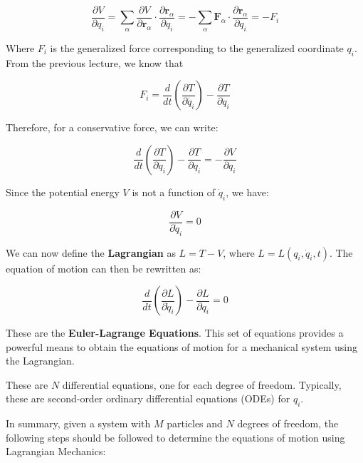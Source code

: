 \begin{equation}
    \frac{\partial V}{\partial q_i}=\sum_\alpha \frac{\partial V}{\partial \mathbf{r}_\alpha} \cdot \frac{\partial \mathbf{r}_\alpha}{\partial q_i}=-\sum_\alpha \mathbf{F}_\alpha \cdot \frac{\partial \mathbf{r}_\alpha}{\partial q_i}=-F_i
\end{equation}

Where $F_i$ is the generalized force corresponding to the generalized coordinate $q_i$.
From the previous lecture, we know that

\begin{equation}
   F_i = \frac{d}{dt} \left(\frac {\partial T}{\partial \dot{q_i}}\right) - \frac{\partial T}{\partial q_i}
\end{equation}

Therefore, for a conservative force, we can write:

\begin{equation}
    \frac{d}{dt} \left(\frac{\partial T}{\partial \dot{q}_i}\right) - \frac{\partial T}{\partial q_i} = -\frac{\partial V}{\partial q_i}
\end{equation}

Since the potential energy $V$ is not a function of $\dot{q}_i$, we have:

\begin{equation}
    \frac{\partial V}{\partial \dot{q}_i}=0
\end{equation}

We can now define the \textbf{Lagrangian} as $L = T - V$, where 
$L = L(q_i, \dot{q}_i, t)$. The equation of motion can then be rewritten as:

\begin{equation}
    \frac{d}{dt} \left(\frac{\partial L}{\partial \dot{q}_i}\right) - \frac{\partial L}{\partial q_i} = 0
\end{equation}

These are the \textbf{Euler-Lagrange Equations}. This set of equations provides a 
powerful means to obtain the equations of motion for a mechanical system using the 
Lagrangian.

These are $N$ differential equations, one for each degree of freedom. Typically, these 
are second-order ordinary differential equations (ODEs) for $q_i$.

In summary, given a system with $M$ particles and $N$ degrees of freedom, the following 
steps should be followed to determine the equations of motion using Lagrangian Mechanics:

